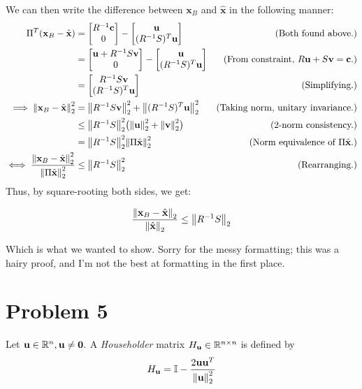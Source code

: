\begin{solution}
We can then write the difference between $\textbf{x}_B$ and $\hat{\textbf{x}}$ in the following manner:
\alignbreak
\begin{align*}
    \Pi^T(\textbf{x}_B - \hat{\textbf{x}}) &= \mqty[R^\inv\textbf{c}\\0] - \mqty[\textbf{u}\\(R^\inv S)^T\textbf{u}] &\text{(Both found above.)}\\
    &= \mqty[\textbf{u} + R^\inv S\textbf{v}\\0] - \mqty[\textbf{u}\\(R^\inv S)^T\textbf{u}] &\text{(From constraint, $R\textbf{u} + S\textbf{v} =\textbf{c}$.)}\\
    &= \mqty[R^\inv S\textbf{v}\\(R^\inv S)^T\textbf{u}] &\text{(Simplifying.)}\\
    \implies \norm{\textbf{x}_B - \hat{\textbf{x}}}_2^2 &= \norm{R^\inv S\textbf{v}}_2^2 + \norm{(R^\inv S)^T \textbf{u}}_2^2 &\text{(Taking norm, unitary invariance.)}\\
    &\leq \norm{R^\inv S}_2^2 \big( \norm{\textbf{u}}_2^2 + \norm{\textbf{v}}_2^2\big) &\text{(2-norm consistency.)}\\
    &= \norm{R^\inv S}_2^2\norm{\Pi\hat{\textbf{x}}}_2^2 &\text{(Norm equivalence of $\Pi \hat{\textbf{x}}$.)}\\
    \iff \frac{\norm{\textbf{x}_B - \hat{\textbf{x}}}_2^2}{\norm{\Pi\hat{\textbf{x}}}_2^2} &\leq \norm{R^\inv S}_2^2 &\text{(Rearranging.)} 
\end{align*}
\alignbreak
\newpage
Thus, by square-rooting both sides, we get:

\[
\frac{\norm{\textbf{x}_B - \hat{\textbf{x}}}_2}{\norm{\hat{\textbf{x}}}_2} \leq \norm{R^{-1} S}_2
\]

Which is what we wanted to show. Sorry for the messy formatting; this was a hairy proof, and I'm not the best at formatting in the first place.
\end{solution}


\newpage
\section{Problem 5}
Let $\textbf{u} \in \mathbb{R}^n, \textbf{u}\neq \textbf{0}.$ A \textit{Householder} matrix $H_\textbf{u} \in \mathbb{R}^{n\times n}$ is defined by 
\[
H_\textbf{u} = \mathbb{I} - \frac{2\textbf{u}\textbf{u}^T}{\norm{\textbf{u}}_2^2}
\]
